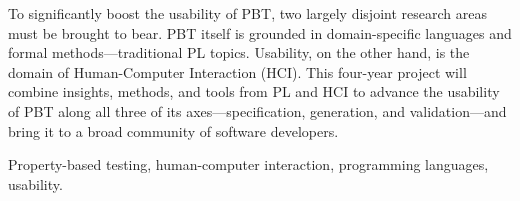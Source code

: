 

To significantly boost the usability of PBT, two largely disjoint
research areas must be
brought to bear.  PBT itself is grounded in domain-specific languages
and formal methods---traditional PL topics.  Usability, on the other
hand, is the domain of Human-Computer Interaction (HCI).
%
This four-year project will combine insights, methods, and tools from
PL and HCI to advance the usability of PBT along all three of its
axes---specification, generation, and validation---and bring it to a
broad community of software developers.

\smallskip

 Property-based testing, human-computer
interaction, programming languages, usability.

